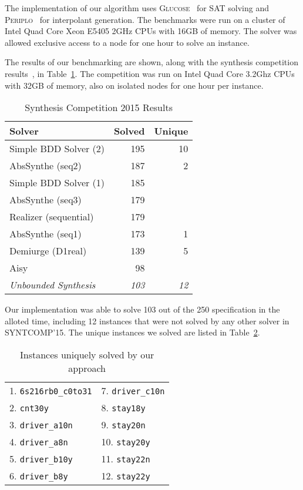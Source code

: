 \documentclass{llncs}
\begin{document}
The implementation of our algorithm uses \textsc{Glucose}~\cite{audemard2014}
for SAT solving and \textsc{Periplo}~\cite{rollini2013} for interpolant
generation. The benchmarks were run on a cluster of Intel Quad Core Xeon E5405
2GHz CPUs with 16GB of memory.  The solver was allowed exclusive access to a node
for one hour to solve an instance.

The results of our benchmarking are shown, along with the synthesis competition
results~\cite{syntcompedacc}, in Table~\ref{tab:syntcomp}. The competition was run on Intel Quad
Core 3.2Ghz CPUs with 32GB of memory, also on isolated nodes for one hour per
instance.

\begin{table}
    \centering
    \setlength{\tabcolsep}{8pt}
    \begin{tabular}{l | r | r }
        \textbf{Solver} & \textbf{Solved} & \textbf{Unique} \\
        \hline
        Simple BDD Solver (2) & 195 & 10 \\
        AbsSynthe (seq2) & 187 & 2 \\
        Simple BDD Solver (1) & 185 & \\
        AbsSynthe (seq3) & 179 & \\
        Realizer (sequential) & 179 & \\
        AbsSynthe (seq1) & 173 & 1 \\
        Demiurge (D1real) & 139 & 5 \\
        Aisy & 98 & \\
        \textit{Unbounded Synthesis} & \textit{103} & \textit{12} \\
    \end{tabular}
    \caption{Synthesis Competition 2015 Results}
    \label{tab:syntcomp}
\end{table}

Our implementation was able to solve 103 out of the 250 specification in the
alloted time, including 12 instances that were not solved by any other
solver in SYNTCOMP'15. The unique instances we solved are listed in
Table~\ref{tab:unique}.

\begin{table}[h]
    \centering
    \setlength{\tabcolsep}{16pt}
    \begin{tabular}{l l}
        1. \texttt{6s216rb0\_c0to31} & 7. \texttt{driver\_c10n} \\
        2. \texttt{cnt30y} &  8. \texttt{stay18y} \\
        3. \texttt{driver\_a10n} & 9. \texttt{stay20n} \\
        4. \texttt{driver\_a8n} & 10. \texttt{stay20y} \\
        5. \texttt{driver\_b10y} & 11. \texttt{stay22n} \\
        6. \texttt{driver\_b8y} & 12. \texttt{stay22y} \\
    \end{tabular}
    \caption{Instances uniquely solved by our approach}
    \label{tab:unique}
\end{table}
\end{document}
